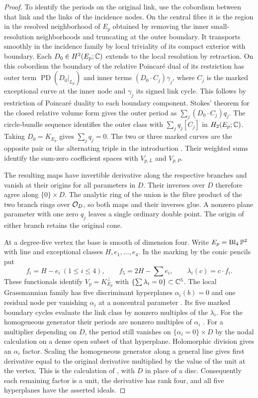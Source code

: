 \begin{proof}
To identify the periods on the original link, use the cobordism between
that link and the links of the incidence nodes. On the central fibre
it is the region in the resolved neighborhood of $E_p$ obtained by
removing the inner small-resolution neighborhoods and truncating at
the outer boundary. It transports smoothly in the incidence family
by local triviality of its compact exterior with boundary. Each
$D_0\in H^2(E_p;\mathbb C)$ extends to the local resolution by retraction.
On this cobordism the boundary of the relative Poincar\'e dual of its
restriction has outer term $\operatorname{PD}(D_0|_{L_p})$ and inner
terms $(D_0\cdot C_j)\gamma_j$, where $C_j$ is the marked exceptional
curve at the inner node and $\gamma_j$ its signed link cycle. This
follows by restriction of Poincar\'e duality to each boundary component.
Stokes' theorem for the closed relative volume form gives the outer
period as $\sum_j(D_0\cdot C_j)q_j$. The circle-bundle sequence
identifies the outer class with $\sum_jq_j[C_j]$ in $H_2(E_p;\mathbb C)$.
Taking $D_0=K_{E_p}$ gives $\sum_j q_j=0$. The two or three marked
curves are the opposite pair or the alternating triple in the
introduction \cite[Proposition~3.7]{W5}. Their weighted sums identify
the sum-zero coefficient spaces with $V_{p,L}$ and $V_{p,P}$.

The resulting maps have invertible derivative along the respective
branches and vanish at their origins for all parameters in $D$.
Their inverses over $D$ therefore agree along $\{0\}\times D$.
The analytic ring of the union is the fibre product of the two branch
rings over $\mathcal O_D$, so both maps and their inverses glue. A nonzero
plane parameter with one zero $q_j$ leaves a single ordinary double
point. The origin of either branch retains the original cone.

At a degree-five vertex the base is smooth of dimension four.
Write $E_p=\operatorname{Bl}_4\mathbb P^2$ with line and exceptional classes
$H,e_1,\dots,e_4$. In the marking by the conic pencils put
\[
 f_i=H-e_i\ (1\leq i\leq4),\qquad f_5=2H-\textstyle\sum e_i,\qquad
 \lambda_i(c)=c\cdot f_i .
\]
These functionals identify $V_p=K_{E_p}^{\perp}$ with
$\{\sum\lambda_i=0\}\subset\mathbb C^5$. The local Grassmannian
family has five discriminant hyperplanes $\alpha_i(b)=0$ and one
residual node per vanishing $\alpha_i$ at a noncentral parameter
\cite[Proposition~3.1 and Lemma~3.2]{W5}. Its five marked boundary
cycles evaluate the link class by nonzero multiples of the $\lambda_i$.
For the homogeneous generator their periods are nonzero multiples of
$\alpha_i$ \cite[Lemma~3.4]{W5}. For a multiplier depending on $D$,
the period still vanishes on $\{\alpha_i=0\}\times D$ by the nodal
calculation on a dense open subset of that hyperplane. Holomorphic
division gives an $\alpha_i$ factor. Scaling the homogeneous generator
along a general line gives first derivative equal to the original
derivative multiplied by the value of the unit at the vertex. This is
the calculation of \cite[proof of Lemma~3.4]{W5}, with $D$ in place
of a disc. Consequently each remaining factor is a unit, the
derivative has rank four, and all five hyperplanes have the asserted
ideals.


\end{proof}
